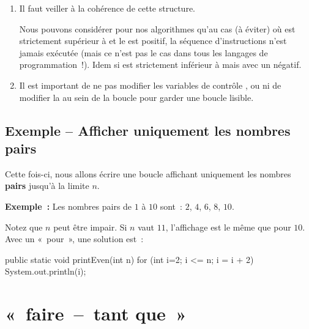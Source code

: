 	\begin{enumerate}
	
		\item Il faut veiller à la cohérence de cette structure. 
		
			Nous pouvons considérer pour nos algorithmes qu’au cas (à éviter) où
			 est strictement supérieur à  et le  est
			positif, la séquence d’instructions n’est jamais exécutée (mais ce
			n’est pas le cas dans tous les langages de programmation~!). Idem si
			 est strictement inférieur à  mais avec un
			 négatif.


		\item Il est important de ne pas modifier les variables de contrôle
			,  ou  ni de modifier la  au
			sein de la boucle pour garder une boucle lisible.

	\end{enumerate}

		
	
		
	
	\subsection{Exemple -- Afficher uniquement les nombres pairs}

		Cette fois-ci, nous allons écrire une boucle affichant uniquement 
		les nombres \textbf{pairs} jusqu’à la limite $n$.
		
		\textbf{Exemple~:}
		Les nombres pairs de $1$ à $10$ sont~: $2$, $4$, $6$, $8$, $10$.
		
		Notez que $n$ peut être impair. 
		Si $n$ vaut $11$, l’affichage est le même que pour $10$.
		Avec un «~pour~», une solution est~:


		\begin{java}
public static void printEven(int n){
	for (int i=2; i <= n; i = i + 2){
		System.out.println(i);
	}
}
		\end{java}



		
		
		
\pagebreak[4]
\section{«~faire~–~tant que~»}


